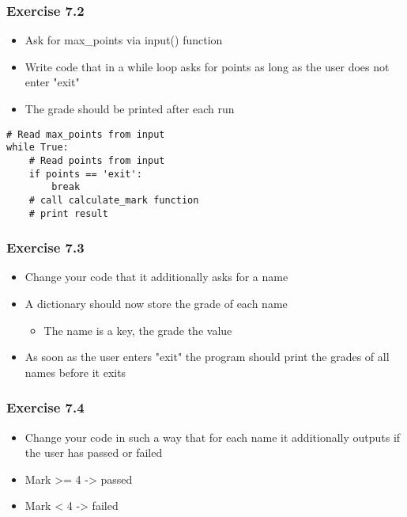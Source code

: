 \documentclass[10pt, a4paper]{beamer} %
\begin{document}
{\begin{frame}
\end{frame}
\begin{frame}\frametitle{Exercise 7.2}

	\begin{itemize}
		\item Ask for max\_points via input() function
		\item Write code that in a while loop asks for points as long as the user does not enter "exit"
		\item The grade should be printed after each run
	\end{itemize}

	{
	\mdseries
	\begin{lstlisting}
# Read max_points from input
while True:
    # Read points from input
    if points == 'exit':
        break
    # call calculate_mark function
    # print result
\end{lstlisting}
	}
\end{frame}
\begin{frame}\frametitle{Exercise 7.3}

	\begin{itemize}
		\item Change your code that it additionally asks for a name
		\item A dictionary should now store the grade of each name
		      \begin{itemize}
			      \item The name is a key, the grade the value
		      \end{itemize}
		\item As soon as the user enters "exit" the program should print the grades of all names before it exits
	\end{itemize}

\end{frame}
\begin{frame}\frametitle{Exercise 7.4}

	\begin{itemize}
		\item Change your code in such a way that for each name it additionally outputs if the user has passed or failed
		\item Mark >= 4 -> passed
		\item Mark < 4 -> failed
	\end{itemize}
\end{frame}

}
\end{document}
